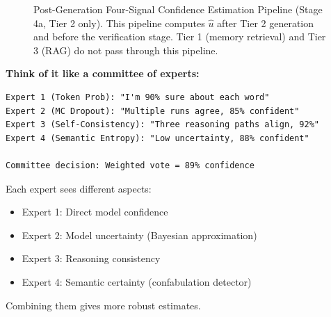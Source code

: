 \documentclass[12pt,a4paper]{article}
\theoremstyle{definition}
\newcommand{\uhat}{\hat{u}}
\begin{document}
\begin{figure}[htbp]
\caption{Post-Generation Four-Signal Confidence Estimation Pipeline (Stage 4a, Tier 2 only). This pipeline computes $\uhat$ after Tier 2 generation and before the verification stage. Tier 1 (memory retrieval) and Tier 3 (RAG) do not pass through this pipeline.}
\label{fig:confidence}
\end{figure}

\begin{intuitionbox}
\textbf{Think of it like a committee of experts:}

\begin{verbatim}
Expert 1 (Token Prob): "I'm 90% sure about each word"
Expert 2 (MC Dropout): "Multiple runs agree, 85% confident"
Expert 3 (Self-Consistency): "Three reasoning paths align, 92%"
Expert 4 (Semantic Entropy): "Low uncertainty, 88% confident"

Committee decision: Weighted vote = 89% confidence
\end{verbatim}

Each expert sees different aspects:
\begin{itemize}
    \item Expert 1: Direct model confidence
    \item Expert 2: Model uncertainty (Bayesian approximation)
    \item Expert 3: Reasoning consistency
    \item Expert 4: Semantic certainty (confabulation detector)
\end{itemize}

Combining them gives more robust estimates.
\end{intuitionbox}
\end{document}
